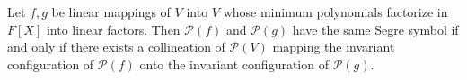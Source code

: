 Let $f, g$ be linear mappings of $V$ into $V$ whose minimum polynomials factorize in $F[X]$ into linear factors. Then $\mathcal{P}(f)$ and $\mathcal{P}(g)$ have the same Segre symbol if and only if there exists a collineation of $\mathcal{P}(V)$ mapping the invariant configuration of $\mathcal{P}(f)$ onto the invariant configuration of $\mathcal{P}(g)$.
